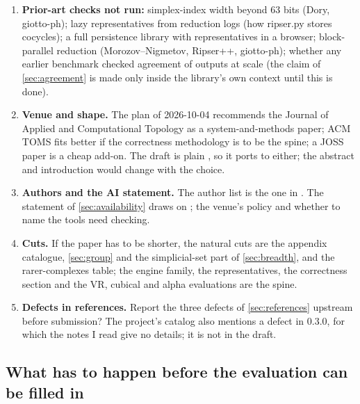\begin{enumerate}[leftmargin=2em, itemsep=3pt]
\item \textbf{Prior-art checks not run:} simplex-index width beyond 63 bits (Dory, giotto-ph); lazy representatives from reduction
  logs (how ripser.py stores cocycles); a full persistence library with representatives in a browser; block-parallel reduction
  (Morozov--Nigmetov, Ripser++, giotto-ph); whether any earlier benchmark checked agreement of outputs at scale (the claim of
  \cref{sec:agreement} is made only inside the library's own context until this is done).
\item \textbf{Venue and shape.} The plan of 2026-10-04 recommends the Journal of Applied and Computational Topology as a system-and-methods paper; ACM TOMS
  fits better if the correctness methodology is to be the spine; a JOSS paper is a cheap add-on. The draft is plain , so it ports
  to either; the abstract and introduction would change with the choice.
\item \textbf{Authors and the AI statement.} The author list is the one in . The statement of \cref{sec:availability}
  draws on ; the venue's policy and whether to name the tools need checking.
\item \textbf{Cuts.} If the paper has to be shorter, the natural cuts are the appendix catalogue, \cref{sec:group} and the
  simplicial-set part of \cref{sec:breadth}, and the rarer-complexes table; the engine family, the representatives, the correctness section and the VR,
  cubical and alpha evaluations are the spine.
\item \textbf{Defects in references.} Report the three defects of \cref{sec:references} upstream before submission? The project's catalog also mentions a
  defect in  0.3.0, for which the notes I read give no details; it is not in the draft.
\end{enumerate}

\subsection{What has to happen before the evaluation can be filled in}

